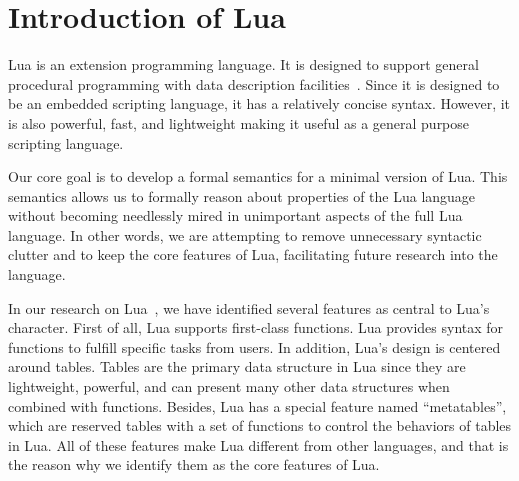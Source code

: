 \chapter{Introduction of Lua}
Lua is an extension programming language. It is designed to support general procedural programming with data description facilities~\cite{EEL}. Since it is designed to be an embedded scripting language, it has a relatively concise syntax. However, it is also powerful, fast, and lightweight making it useful as a general purpose scripting language.



Our core goal is to develop a formal semantics for a minimal version of Lua. This semantics allows us to formally reason about properties of the Lua language without becoming needlessly mired in unimportant aspects of the full Lua language. In other words, we are attempting to remove unnecessary syntactic clutter and to keep the core features of Lua, facilitating future research into the language.


In our research on Lua~\cite{LRM}, we have identified several features as central to Lua's character. First of all, Lua supports first-class functions. Lua provides syntax for functions to fulfill specific tasks from users. In addition, Lua's design is centered around tables. Tables are the primary data structure in Lua since they are lightweight, powerful, and can present many other data structures when combined with functions. Besides, Lua has a special feature named ``metatables'', which are reserved tables with a set of functions to control the behaviors of tables in Lua. All of these features make Lua different from other languages, and that is the reason why we identify them as the core features of Lua.

